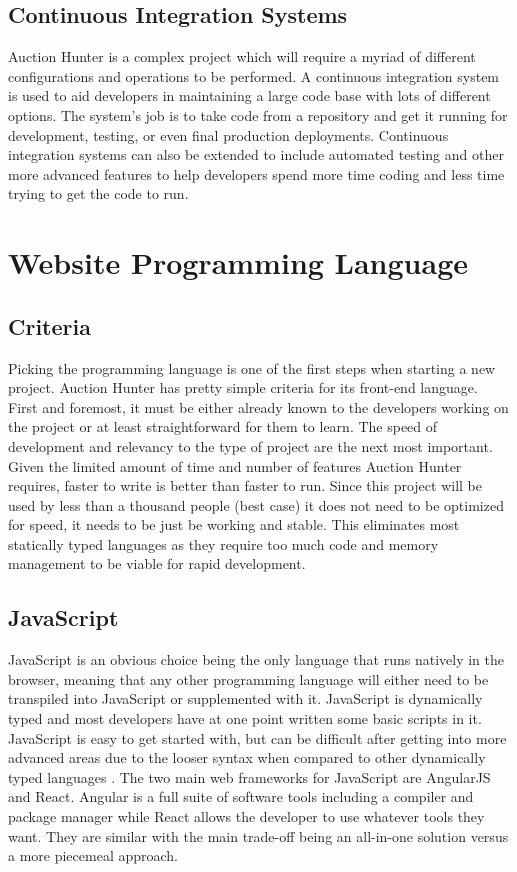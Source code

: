 \documentclass[onecolumn, draftclsnofoot,10pt, compsoc]{IEEEtran}
\begin{document}
\subsection{Continuous Integration Systems}
Auction Hunter is a complex project which will require a myriad of different configurations and operations to be performed. A continuous integration system is used to aid developers in maintaining a large code base with lots of different options. The system's job is to take code from a repository and get it running for development, testing, or even final production deployments. Continuous integration systems can also be extended to include automated testing and other more advanced features to help developers spend more time coding and less time trying to get the code to run. 

\section{Website Programming Language}
\subsection{Criteria}
Picking the programming language is one of the first steps when starting a new project. Auction Hunter has pretty simple criteria for its front-end language. First and foremost, it must be either already known to the developers working on the project or at least straightforward for them to learn. The speed of development and relevancy to the type of project are the next most important. Given the limited amount of time and number of features Auction Hunter requires, faster to write is better than faster to run. Since this project will be used by less than a thousand people (best case) it does not need to be optimized for speed, it needs to be just be working and stable. This eliminates most statically typed languages as they require too much code and memory management to be viable for rapid development.

\subsection{JavaScript}
JavaScript is an obvious choice being the only language that runs natively in the browser, meaning that any other programming language will either need to be transpiled into JavaScript or supplemented with it. JavaScript is dynamically typed and most developers have at one point written some basic scripts in it. JavaScript is easy to get started with, but can be difficult after getting into more advanced areas due to the looser syntax when compared to other dynamically typed languages \cite{javascript}. The two main web frameworks for JavaScript are AngularJS and React. Angular is a full suite of software tools including a compiler and package manager while React allows the developer to use whatever tools they want. They are similar with the main trade-off being an all-in-one solution versus a more piecemeal approach. 
\end{document}
